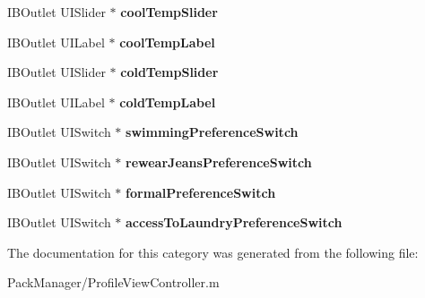 \begin{DoxyCompactItemize}
\item 
\hypertarget{category_profile_view_controller_07_08_a8a9ce9eaac3d75ce587e689fbe598df2}{I\-B\-Outlet U\-I\-Slider $\ast$ {\bfseries cool\-Temp\-Slider}}\label{category_profile_view_controller_07_08_a8a9ce9eaac3d75ce587e689fbe598df2}

\item 
\hypertarget{category_profile_view_controller_07_08_aee8c55e0c0ca0c5d1962b88bc1c6c1c5}{I\-B\-Outlet U\-I\-Label $\ast$ {\bfseries cool\-Temp\-Label}}\label{category_profile_view_controller_07_08_aee8c55e0c0ca0c5d1962b88bc1c6c1c5}

\item 
\hypertarget{category_profile_view_controller_07_08_a9f7c13a860eb2ea38a1c0064a126c312}{I\-B\-Outlet U\-I\-Slider $\ast$ {\bfseries cold\-Temp\-Slider}}\label{category_profile_view_controller_07_08_a9f7c13a860eb2ea38a1c0064a126c312}

\item 
\hypertarget{category_profile_view_controller_07_08_afe8b73929d3ae3bfd3b98eda41ce443f}{I\-B\-Outlet U\-I\-Label $\ast$ {\bfseries cold\-Temp\-Label}}\label{category_profile_view_controller_07_08_afe8b73929d3ae3bfd3b98eda41ce443f}

\item 
\hypertarget{category_profile_view_controller_07_08_a6bd271b6f0cd9c4a2f18bec7eb09063e}{I\-B\-Outlet U\-I\-Switch $\ast$ {\bfseries swimming\-Preference\-Switch}}\label{category_profile_view_controller_07_08_a6bd271b6f0cd9c4a2f18bec7eb09063e}

\item 
\hypertarget{category_profile_view_controller_07_08_aae60ad5fd771b0aae83227268ddf2546}{I\-B\-Outlet U\-I\-Switch $\ast$ {\bfseries rewear\-Jeans\-Preference\-Switch}}\label{category_profile_view_controller_07_08_aae60ad5fd771b0aae83227268ddf2546}

\item 
\hypertarget{category_profile_view_controller_07_08_ac65a8528c99524566c2002530cb60fcd}{I\-B\-Outlet U\-I\-Switch $\ast$ {\bfseries formal\-Preference\-Switch}}\label{category_profile_view_controller_07_08_ac65a8528c99524566c2002530cb60fcd}

\item 
\hypertarget{category_profile_view_controller_07_08_a2038df29da26d89e9b2f81b3c4d2f982}{I\-B\-Outlet U\-I\-Switch $\ast$ {\bfseries access\-To\-Laundry\-Preference\-Switch}}\label{category_profile_view_controller_07_08_a2038df29da26d89e9b2f81b3c4d2f982}

\end{DoxyCompactItemize}


The documentation for this category was generated from the following file\-:\begin{DoxyCompactItemize}
\item 
Pack\-Manager/Profile\-View\-Controller.\-m\end{DoxyCompactItemize}
